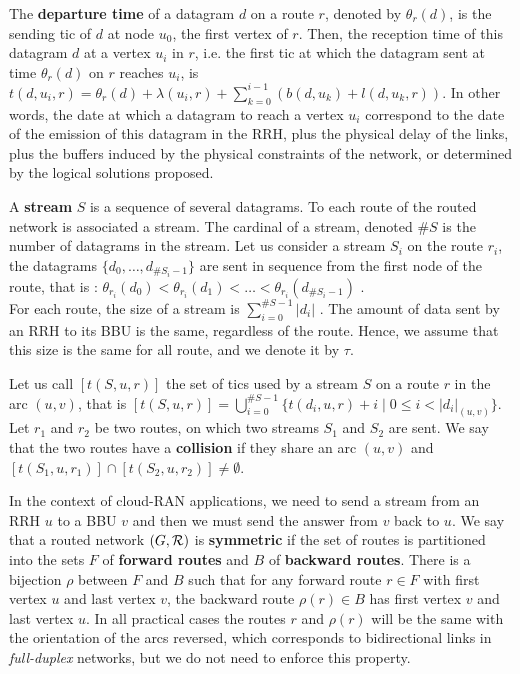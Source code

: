 \documentclass[10pt]{article}
\begin{document}
The \textbf{departure time} of a datagram $d$ on a route $r$, denoted by $\theta_r(d)$, is the sending tic of $d$ at node $u_0$, the first vertex of $r$. 
  Then, the reception time of this datagram $d$ at a vertex $u_i$ in $r$, i.e. the first tic at which the datagram sent at time $\theta_r(d)$ on $r$ reaches $u_i$, is $t(d,u_i,r) = \theta_r(d) + \lambda(u_i,r) + \sum_{k=0}^{i-1}( b(d,u_k) + l(d,u_k,r))$. In other words, the date at which a datagram to reach a vertex $u_i$ correspond to the date of the emission of this datagram in the RRH, plus the physical delay of the links, plus the buffers induced by the physical constraints of the network, or determined by the logical solutions proposed.
   
        A {\bf stream} $S$ is a sequence of several datagrams. To each route of the routed network is associated a stream. The cardinal of a stream, denoted $\#S$ is the number of datagrams in the stream. Let us consider a stream $S_i$ on the route $r_i$, the datagrams $\{d_0,\ldots,d_{\#S_i-1}\}$ are sent in sequence from the first node of the route, that is : $\theta_{r_i}(d_0) < \theta_{r_i}(d_1) < \ldots < \theta_{r_i}(d_{\#S_i-1})$ .  \\
       For each route, the size of a stream is $\sum_{i=0}^{{\#S-1}} |d_i|$ . The amount of data sent by an RRH to its BBU is the same, regardless of the route. Hence, we assume that this size is the same for all route, and we denote it by $\tau$. 
        
          
       Let us call $[t(S,u,r)]$ the set of tics used by a stream $S$ on a route $r$ in the arc $(u,v)$, that is $[t(S,u,r)] =  \bigcup_{i=0}^{\#S -1} \{t(d_i,u,r) + i \mid 0 \leq i < |d_i|_{(u,v)}\}$.
      Let $r_1$ and $r_2$ be two routes, on which two streams $S_1$ and $S_2$ are sent.
      We say that the two routes have a {\bf collision} if they share an arc $(u,v)$ and $[t(S_1,u,r_{1})] \cap [t(S_2,u,r_{2})] \neq \emptyset$.
            
   In the context of cloud-RAN applications, we need to send a stream from an RRH $u$ to a BBU $v$ and then 
      we must send the answer from $v$ back to $u$. We say that a routed network $(G, {\cal R})$ is \textbf{symmetric} if the set of routes is partitioned into the sets $F$ of \textbf{forward routes} and $B$ of \textbf{backward routes}. There is a bijection $\rho$ between $F$ and $B$ such that for any forward route $r \in F$ with first vertex $u$ and last vertex $v$, the backward route $\rho(r) \in B$ has first vertex $v$ and last vertex $u$. In all practical cases the routes $r$ and $\rho(r)$ will be the same with the orientation of the arcs reversed, which corresponds to bidirectional links in \emph{full-duplex} networks, but we do not need to enforce this property.
\end{document}
